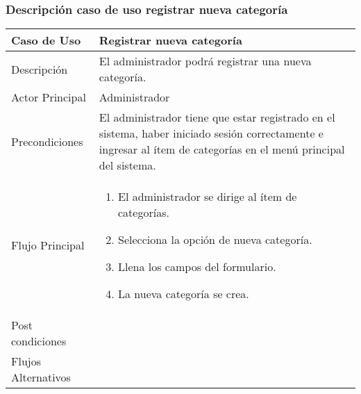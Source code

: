 \documentclass[12pt,a4paper]{article}
\begin{document}
    \newpage
\subsubsection*{Descripción caso de uso registrar nueva categoría}
\begin{table}[h]
        \centering
        \begin{tabular}{| p{3cm}| p{11cm} |} 
        \hline  
        Caso de Uso         &    \textbf{Registrar nueva categoría }   \\ 
        \hline
        Descripción         &    El administrador podrá registrar una nueva categoría.   \\ 
        \hline
        Actor Principal     &  Administrador    \\ 
        \hline
        Precondiciones      &   El administrador tiene que estar registrado en el sistema, haber iniciado sesión correctamente e ingresar al ítem de categorías en el menú principal del sistema.  	\\
        \hline
        Flujo Principal     &    

            \begin{enumerate}
                \item El administrador se dirige al ítem de categorías.
                \item Selecciona la opción de nueva categoría.
                \item Llena los campos del formulario.
                \item La nueva categoría se crea.
            \end{enumerate}
        \\  
        \hline
        Post condiciones    &       \\  
        \hline
        Flujos Alternativos &       \\  
        \hline
        \end{tabular}
    \end{table}


    \newpage
\end{document}
